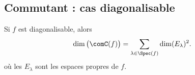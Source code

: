 \subsection{Commutant : cas diagonalisable}

\begin{proposition}      \label{PROPooRHHEooIRGmtl}
	Si \( f\) est diagonalisable, alors
	\begin{equation}        \label{EQooOTFLooPUKAos}
		\dim\big( \comC(f) \big)=\sum_{\lambda\in\Spec(f)}\dim(E_{\lambda})^2.
	\end{equation}
	où les \( E_{\lambda} \) sont les espaces propres de \( f\).
\end{proposition}

